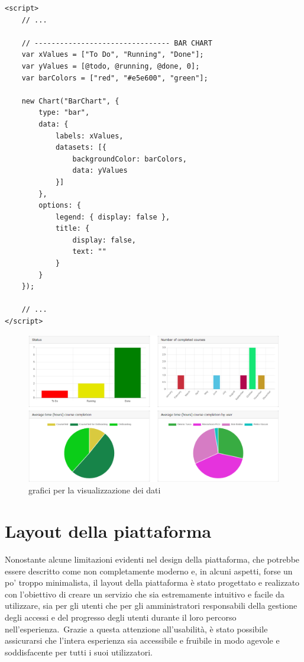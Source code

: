 \begin{lstlisting}[style=javascript_style, caption=esempio sezione codice Javascript per la creazione di un grafico a barre per la rappresentazione dei dati]
<script>
	// ...
	
	// -------------------------------- BAR CHART
    var xValues = ["To Do", "Running", "Done"];
    var yValues = [@todo, @running, @done, 0];
    var barColors = ["red", "#e5e600", "green"];

    new Chart("BarChart", {
        type: "bar",
        data: {
            labels: xValues,
            datasets: [{
                backgroundColor: barColors,
                data: yValues
            }]
        },
        options: {
            legend: { display: false },
            title: {
                display: false,
                text: ""
            }
        }
    });

	// ...
</script>
\end{lstlisting}
%
\begin{figure}[H]
	\centering
	\includegraphics[width=\textwidth]{img/charts.png}
	\caption{grafici per la visualizzazione dei dati}
	\label{fig:charts}
\end{figure}
%
\section{Layout della piattaforma}\label{sec:cap_sec_subsec}
Nonostante alcune limitazioni evidenti nel design della piattaforma, che potrebbe essere descritto come non completamente moderno e, 
in alcuni aspetti, forse un po' troppo minimalista, il layout della piattaforma è stato progettato e realizzato con l'obiettivo di 
creare un servizio che sia estremamente intuitivo e facile da utilizzare, sia per gli utenti 
che per gli amministratori responsabili della gestione degli accessi e del progresso degli utenti 
durante il loro percorso nell'esperienza.\ Grazie a questa attenzione all'usabilità, 
è stato possibile assicurarsi che l'intera esperienza sia accessibile e fruibile in modo agevole 
e soddisfacente per tutti i suoi utilizzatori.
\\ \\

